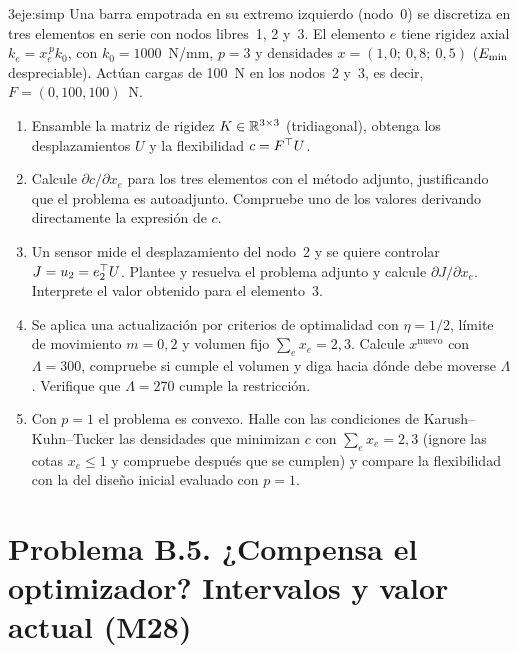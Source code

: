 \begin{ejercicio}{3}{eje:simp}
Una barra empotrada en su extremo izquierdo (nodo~0) se discretiza en tres elementos en serie con nodos libres~1, 2 y~3. El elemento $e$ tiene rigidez axial $k_e=x_e^{\,p}k_0$, con $k_0=1000$~N/mm, $p=3$ y densidades $x=(1{,}0;\ 0{,}8;\ 0{,}5)$ ($E_{\min}$ despreciable). Actúan cargas de 100~N en los nodos~2 y~3, es decir, $F=(0,100,100)$~N.
\begin{enumerate}[label=(\alph*)]
  \item {} Ensamble la matriz de rigidez $K\in\mathbb{R}^{3\times 3}$ (tridiagonal), obtenga los desplazamientos $U$ y la flexibilidad $c=F^{\top} U$.
  \item {} Calcule $\partial c/\partial x_e$ para los tres elementos con el método adjunto, justificando que el problema es autoadjunto. Compruebe uno de los valores derivando directamente la expresión de $c$.
  \item {} Un sensor mide el desplazamiento del nodo~2 y se quiere controlar $J=u_2=e_2^{\top} U$. Plantee y resuelva el problema adjunto y calcule $\partial J/\partial x_e$. Interprete el valor obtenido para el elemento~3.
  \item {} Se aplica una actualización por criterios de optimalidad con $\eta=1/2$, límite de movimiento $m=0{,}2$ y volumen fijo $\sum_ex_e=2{,}3$. Calcule $x^{\text{nuevo}}$ con $\Lambda=300$, compruebe si cumple el volumen y diga hacia dónde debe moverse $\Lambda$. Verifique que $\Lambda=270$ cumple la restricción.
  \item {} Con $p=1$ el problema es convexo. Halle con las condiciones de Karush--Kuhn--Tucker las densidades que minimizan $c$ con $\sum_ex_e=2{,}3$ (ignore las cotas $x_e\le 1$ y compruebe después que se cumplen) y compare la flexibilidad con la del diseño inicial evaluado con $p=1$.
\end{enumerate}
\end{ejercicio}

\section*{Problema B.5. ¿Compensa el optimizador? Intervalos y valor actual (M28)}

